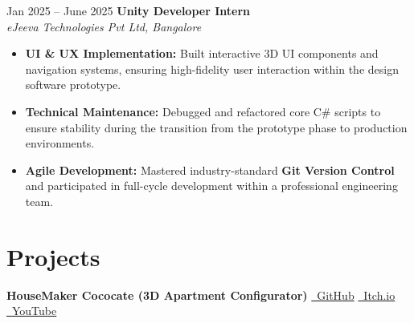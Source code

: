 \documentclass[10pt, letterpaper]{article}
\newenvironment{highlights}{
    \begin{itemize}[topsep=0.05cm, parsep=0.05cm, itemsep=0pt, leftmargin=10pt]
}{
    \end{itemize}
}
\begin{document}
\vspace{0.2 cm} 

\begin{twocolentry}{
    Jan 2025 – June 2025
}
    \textbf{Unity Developer Intern} \\
    \textit{eJeeva Technologies Pvt Ltd, Bangalore} 
\end{twocolentry}

\vspace{0.1 cm}
\begin{onecolentry}
    \begin{highlights}
        \item \textbf{UI \& UX Implementation:} Built interactive 3D UI components and navigation systems, ensuring high-fidelity user interaction within the design software prototype.
        \item \textbf{Technical Maintenance:} Debugged and refactored core C\# scripts to ensure stability during the transition from the prototype phase to production environments.
        \item \textbf{Agile Development:} Mastered industry-standard \textbf{Git Version Control} and participated in full-cycle development within a professional engineering team.
    \end{highlights}
\end{onecolentry}
\section{Projects}

\vspace{0.3cm}
\begin{twocolentry}{
    \textbf{HouseMaker Cococate (3D Apartment Configurator)}
}
    \hfill  
    \href{https://github.com/hashiq-11/HouseMakerCococat.git}{\faGithub~GitHub} \quad
    \href{https://h-ashiq-hq.itch.io/housemakercococat}{\faGamepad~Itch.io} \quad
    \href{https://youtu.be/KWxjTdjD5WY}{\faYoutube~YouTube}
\end{twocolentry}

\vspace{0.1 cm}
\end{document}
